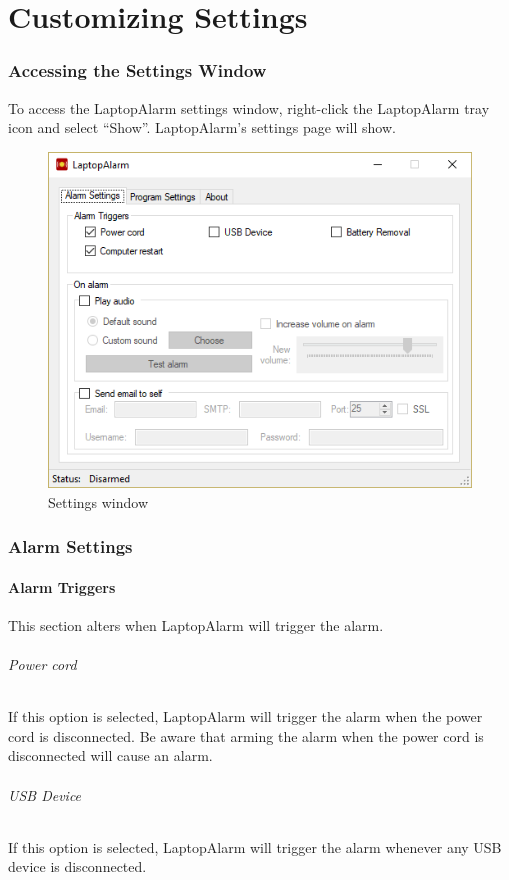 \documentclass[12pt, letterpaper]{article}
\begin{document}
\part{Customizing Settings}
\section{Accessing the Settings Window}
To access the LaptopAlarm settings window, right-click the LaptopAlarm tray icon and select ``Show''. LaptopAlarm's settings page will show.

\begin{figure}[H]
  \caption{Settings window}
  \centering
    \includegraphics{figures/figure06.png}
\end{figure}

\section{Alarm Settings}
\subsection{Alarm Triggers}
This section alters when LaptopAlarm will trigger the alarm.
\paragraph{Power cord}
If this option is selected, LaptopAlarm will trigger the alarm when the power cord is disconnected. Be aware that arming the alarm when the power cord is disconnected will cause an alarm.
\paragraph{USB Device}
If this option is selected, LaptopAlarm will trigger the alarm whenever any USB device is disconnected.
\end{document}

